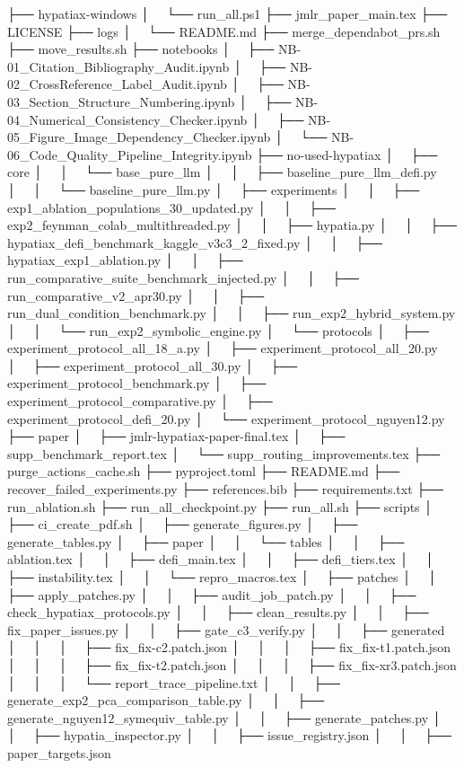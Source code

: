 ├── hypatiax-windows
│   └── run_all.ps1
├── jmlr_paper_main.tex
├── LICENSE
├── logs
│   └── README.md
├── merge_dependabot_prs.sh
├── move_results.sh
├── notebooks
│   ├── NB-01_Citation_Bibliography_Audit.ipynb
│   ├── NB-02_CrossReference_Label_Audit.ipynb
│   ├── NB-03_Section_Structure_Numbering.ipynb
│   ├── NB-04_Numerical_Consistency_Checker.ipynb
│   ├── NB-05_Figure_Image_Dependency_Checker.ipynb
│   └── NB-06_Code_Quality_Pipeline_Integrity.ipynb
├── no-used-hypatiax
│   ├── core
│   │   └── base_pure_llm
│   │       ├── baseline_pure_llm_defi.py
│   │       └── baseline_pure_llm.py
│   ├── experiments
│   │   ├── exp1_ablation_populations_30_updated.py
│   │   ├── exp2_feynman_colab_multithreaded.py
│   │   ├── hypatia.py
│   │   ├── hypatiax_defi_benchmark_kaggle_v3c3_2_fixed.py
│   │   ├── hypatiax_exp1_ablation.py
│   │   ├── run_comparative_suite_benchmark_injected.py
│   │   ├── run_comparative_v2_apr30.py
│   │   ├── run_dual_condition_benchmark.py
│   │   ├── run_exp2_hybrid_system.py
│   │   └── run_exp2_symbolic_engine.py
│   └── protocols
│       ├── experiment_protocol_all_18_a.py
│       ├── experiment_protocol_all_20.py
│       ├── experiment_protocol_all_30.py
│       ├── experiment_protocol_benchmark.py
│       ├── experiment_protocol_comparative.py
│       ├── experiment_protocol_defi_20.py
│       └── experiment_protocol_nguyen12.py
├── paper
│   ├── jmlr-hypatiax-paper-final.tex
│   ├── supp_benchmark_report.tex
│   └── supp_routing_improvements.tex
├── purge_actions_cache.sh
├── pyproject.toml
├── README.md
├── recover_failed_experiments.py
├── references.bib
├── requirements.txt
├── run_ablation.sh
├── run_all_checkpoint.py
├── run_all.sh
├── scripts
│   ├── ci_create_pdf.sh
│   ├── generate_figures.py
│   ├── generate_tables.py
│   ├── paper
│   │   └── tables
│   │       ├── ablation.tex
│   │       ├── defi_main.tex
│   │       ├── defi_tiers.tex
│   │       ├── instability.tex
│   │       └── repro_macros.tex
│   ├── patches
│   │   ├── apply_patches.py
│   │   ├── audit_job_patch.py
│   │   ├── check_hypatiax_protocols.py
│   │   ├── clean_results.py
│   │   ├── fix_paper_issues.py
│   │   ├── gate_c3_verify.py
│   │   ├── generated
│   │   │   ├── fix_fix-c2.patch.json
│   │   │   ├── fix_fix-t1.patch.json
│   │   │   ├── fix_fix-t2.patch.json
│   │   │   ├── fix_fix-xr3.patch.json
│   │   │   └── report_trace_pipeline.txt
│   │   ├── generate_exp2_pca_comparison_table.py
│   │   ├── generate_nguyen12_symequiv_table.py
│   │   ├── generate_patches.py
│   │   ├── hypatia_inspector.py
│   │   ├── issue_registry.json
│   │   ├── paper_targets.json
